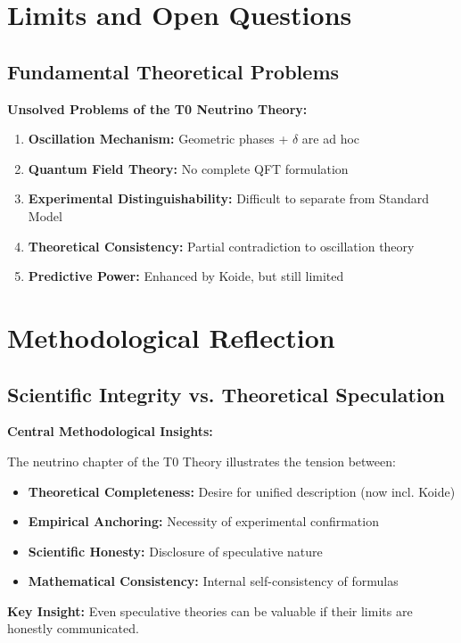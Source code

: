 	\section{Limits and Open Questions}
	
	\subsection{Fundamental Theoretical Problems}
	
	\begin{warning}
		\textbf{Unsolved Problems of the T0 Neutrino Theory:}
		
		\begin{enumerate}
			\item \textbf{Oscillation Mechanism:} Geometric phases + $\delta$ are ad hoc
			\item \textbf{Quantum Field Theory:} No complete QFT formulation
			\item \textbf{Experimental Distinguishability:} Difficult to separate from Standard Model
			\item \textbf{Theoretical Consistency:} Partial contradiction to oscillation theory
			\item \textbf{Predictive Power:} Enhanced by Koide, but still limited
		\end{enumerate}
	\end{warning}
	
	\section{Methodological Reflection}
	
	\subsection{Scientific Integrity vs. Theoretical Speculation}
	
	\begin{keyresult}
		\textbf{Central Methodological Insights:}
		
		The neutrino chapter of the T0 Theory illustrates the tension between:
		
		\begin{itemize}
			\item \textbf{Theoretical Completeness:} Desire for unified description (now incl. Koide)
			\item \textbf{Empirical Anchoring:} Necessity of experimental confirmation
			\item \textbf{Scientific Honesty:} Disclosure of speculative nature
			\item \textbf{Mathematical Consistency:} Internal self-consistency of formulas
		\end{itemize}
		
		\textbf{Key Insight:} Even speculative theories can be valuable if their limits are honestly communicated.
	\end{keyresult}
	
